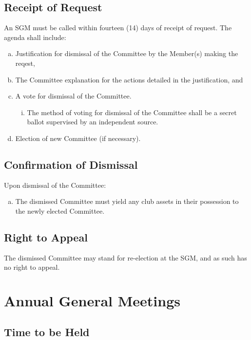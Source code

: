 \documentclass[a4paper,12pt]{article}
\begin{document}
\subsection{Receipt of Request}

An SGM must be called within fourteen (14) days of receipt of request. The agenda shall include:

\begin{enumerate}[a)]
	\item Justification for dismissal of the Committee by the Member(s) making the reqest,
	\item The Committee explanation for the actions detailed in the justification, and
	\item A vote for dismissal of the Committee.
	\begin{enumerate}[i)]
		\item The method of voting for dismissal of the Committee shall be a secret ballot supervised by an independent source.
	\end{enumerate}
	\item Election of new Committee (if necessary).
\end{enumerate}

\subsection{Confirmation of Dismissal}

Upon dismissal of the Committee:

\begin{enumerate}[a)]
	\item The dismissed Committee must yield any club assets in their possession to the newly elected Committee.
\end{enumerate}

\subsection{Right to Appeal}

The dismissed Committee may stand for re-election at the SGM, and as such has no right to appeal.

\section{Annual General Meetings}

\subsection{Time to be Held}
\end{document}
